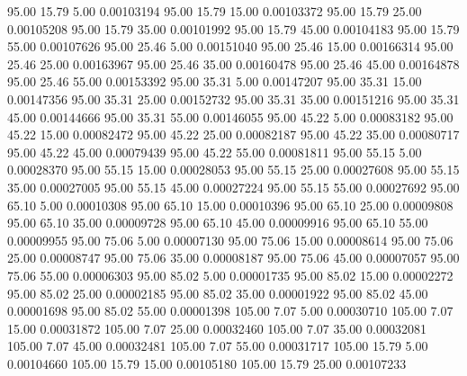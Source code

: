      95.00     15.79      5.00     0.00103194
     95.00     15.79     15.00     0.00103372
     95.00     15.79     25.00     0.00105208
     95.00     15.79     35.00     0.00101992
     95.00     15.79     45.00     0.00104183
     95.00     15.79     55.00     0.00107626
     95.00     25.46      5.00     0.00151040
     95.00     25.46     15.00     0.00166314
     95.00     25.46     25.00     0.00163967
     95.00     25.46     35.00     0.00160478
     95.00     25.46     45.00     0.00164878
     95.00     25.46     55.00     0.00153392
     95.00     35.31      5.00     0.00147207
     95.00     35.31     15.00     0.00147356
     95.00     35.31     25.00     0.00152732
     95.00     35.31     35.00     0.00151216
     95.00     35.31     45.00     0.00144666
     95.00     35.31     55.00     0.00146055
     95.00     45.22      5.00     0.00083182
     95.00     45.22     15.00     0.00082472
     95.00     45.22     25.00     0.00082187
     95.00     45.22     35.00     0.00080717
     95.00     45.22     45.00     0.00079439
     95.00     45.22     55.00     0.00081811
     95.00     55.15      5.00     0.00028370
     95.00     55.15     15.00     0.00028053
     95.00     55.15     25.00     0.00027608
     95.00     55.15     35.00     0.00027005
     95.00     55.15     45.00     0.00027224
     95.00     55.15     55.00     0.00027692
     95.00     65.10      5.00     0.00010308
     95.00     65.10     15.00     0.00010396
     95.00     65.10     25.00     0.00009808
     95.00     65.10     35.00     0.00009728
     95.00     65.10     45.00     0.00009916
     95.00     65.10     55.00     0.00009955
     95.00     75.06      5.00     0.00007130
     95.00     75.06     15.00     0.00008614
     95.00     75.06     25.00     0.00008747
     95.00     75.06     35.00     0.00008187
     95.00     75.06     45.00     0.00007057
     95.00     75.06     55.00     0.00006303
     95.00     85.02      5.00     0.00001735
     95.00     85.02     15.00     0.00002272
     95.00     85.02     25.00     0.00002185
     95.00     85.02     35.00     0.00001922
     95.00     85.02     45.00     0.00001698
     95.00     85.02     55.00     0.00001398
    105.00      7.07      5.00     0.00030710
    105.00      7.07     15.00     0.00031872
    105.00      7.07     25.00     0.00032460
    105.00      7.07     35.00     0.00032081
    105.00      7.07     45.00     0.00032481
    105.00      7.07     55.00     0.00031717
    105.00     15.79      5.00     0.00104660
    105.00     15.79     15.00     0.00105180
    105.00     15.79     25.00     0.00107233
